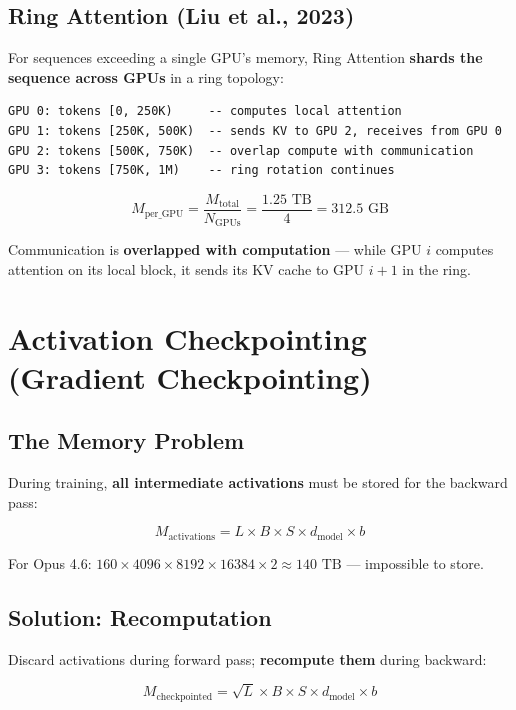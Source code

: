 \documentclass[11pt,a4paper]{article}
\begin{document}
\subsection{Ring Attention (Liu et al., 2023)}

For sequences exceeding a single GPU's memory, Ring Attention \textbf{shards the sequence across GPUs} in a ring topology:

\begin{lstlisting}[basicstyle=\ttfamily\small, caption={Ring Attention --- Distributed Long Context}]
GPU 0: tokens [0, 250K)     -- computes local attention
GPU 1: tokens [250K, 500K)  -- sends KV to GPU 2, receives from GPU 0
GPU 2: tokens [500K, 750K)  -- overlap compute with communication
GPU 3: tokens [750K, 1M)    -- ring rotation continues
\end{lstlisting}

$$M_{\text{per\_GPU}} = \frac{M_{\text{total}}}{N_{\text{GPUs}}} = \frac{1.25\text{ TB}}{4} = 312.5\text{ GB}$$

Communication is \textbf{overlapped with computation} --- while GPU $i$ computes attention on its local block, it sends its KV cache to GPU $i+1$ in the ring.

\section{Activation Checkpointing (Gradient Checkpointing)}

\subsection{The Memory Problem}

During training, \textbf{all intermediate activations} must be stored for the backward pass:

$$M_{\text{activations}} = L \times B \times S \times d_{\text{model}} \times b$$

For Opus 4.6: $160 \times 4096 \times 8192 \times 16384 \times 2 \approx 140\text{ TB}$ --- impossible to store.

\subsection{Solution: Recomputation}

Discard activations during forward pass; \textbf{recompute them} during backward:

$$M_{\text{checkpointed}} = \sqrt{L} \times B \times S \times d_{\text{model}} \times b$$
\end{document}
